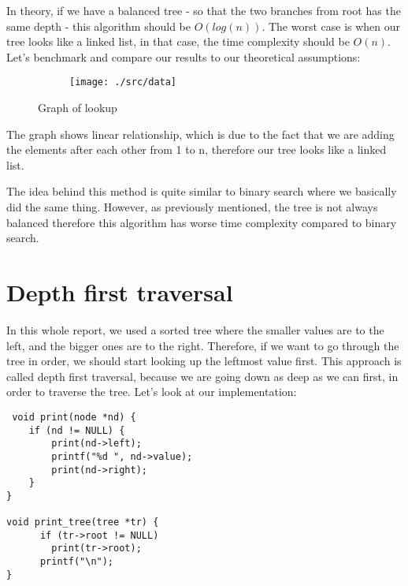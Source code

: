 \documentclass[a4paper,11pt]{article}
\begin{document}
    In theory, if we have a balanced tree - so that the two branches from root has the same depth - this algorithm should be $O(log(n))$.
    The worst case is when our tree looks like a linked list, in that case, the time complexity should be $O(n)$.
    Let's benchmark and compare our results to our theoretical assumptions:

    \begin{figure}[H]
        \centering
        \begin{subfigure}[b]{.5\textwidth}
            \centering
            \texttt{[image: ./src/data]} %
        \end{subfigure}
        \caption{Graph of lookup}
        \label{fig:graph_1}
    \end{figure}

    The graph shows linear relationship, which is due to the fact that we are adding the elements after each other from 1 to n, therefore our tree looks like a linked list.
    
    The idea behind this method is quite similar to binary search where we basically did the same thing.
    However, as previously mentioned, the tree is not always balanced therefore this algorithm has worse time complexity compared to binary search.

    \section*{Depth first traversal}

    In this whole report, we used a sorted tree where the smaller values are to the left, and the bigger ones are to the right.
    Therefore, if we want to go through the tree in order, we should start looking up the leftmost value first.
    This approach is called depth first traversal, because we are going down as deep as we can first, in order to traverse the tree.
    Let's look at our implementation:
    \begin{verbatim}
 void print(node *nd) {
    if (nd != NULL) {
        print(nd->left);
        printf("%d ", nd->value);
        print(nd->right);
    }
}

void print_tree(tree *tr) {
      if (tr->root != NULL)
        print(tr->root);
      printf("\n");
}
    \end{verbatim}
\end{document}

